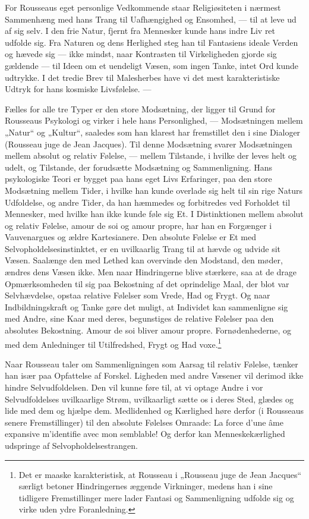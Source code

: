 \documentclass[12pt,a4paper,openany]{book}
\newcommand{\opage}[1]{\marginnote{\footnotesize\textit{[#1]}}}
\begin{document}
For Rousseaus eget personlige Vedkommende staar Religiøsiteten
i nærmest Sammenhæng med hans Trang til Uafhængighed
og Ensomhed, --- til at leve ud af sig selv. I den frie
Natur, fjernt fra Mennesker kunde hans indre Liv ret udfolde
sig. Fra Naturen og dens Herlighed steg han til Fantasiens
ideale Verden og hævede sig --- ikke mindst, naar Kontrasten
til Virkeligheden gjorde sig gældende --- til Ideen om et uendeligt
Væsen, som ingen Tanke, intet Ord kunde udtrykke. I
det tredie Brev til Malesherbes have vi det mest karakteristiske
Udtryk for hans kosmiske Livsfølelse. ---

Fælles for alle tre Typer er den store Modsætning, der
ligger til Grund for Rousseaus Psykologi og virker i hele hans
Personlighed, --- Modsætningen mellem „Natur“ og „Kultur“,
saaledes som han klarest har fremstillet den i sine Dialoger
(Rousseau juge de Jean Jacques). Til denne Modsætning svarer
Modsætningen mellem absolut og relativ Følelse, --- mellem Tilstande,
i hvilke der leves helt og udelt, og Tilstande, der
forudsætte Modsætning og Sammenligning. Hans psykologiske
Teori er bygget paa hans eget Livs Erfaringer, paa den store
Modsætning mellem Tider, i hvilke han kunde overlade sig
helt til sin rige Naturs Udfoldelse, og andre Tider, da han
\setcounter{footnote}{0}%
\opage{147}hæmmedes og forbitredes ved Forholdet til Mennesker, med
hvilke han ikke kunde føle sig Et. I Distinktionen mellem absolut
og relativ Følelse, amour de soi og amour propre, har
han en Forgænger i Vauvenargues og ældre Kartesianere. Den
absolute Følelse er Et med Selvopholdelsesinstinktet, er en uvilkaarlig
Trang til at hævde og udvide sit Væsen. Saalænge den
med Lethed kan overvinde den Modstand, den møder, ændres
dens Væsen ikke. Men naar Hindringerne blive stærkere, saa
at de drage Opmærksomheden til sig paa Bekostning af det oprindelige
Maal, der blot var Selvhævdelse, opstaa relative Følelser
som Vrede, Had og Frygt. Og naar Indbildningskraft og
Tanke gøre det muligt, at Individet kan sammenligne sig med
Andre, sine Kaar med deres, begunstiges de relative Følelser
paa den absolutes Bekostning. Amour de soi bliver amour propre.
Fornødenhederne, og med dem Anledninger til Utilfredshed, Frygt
og Had voxe.\footnote[1]{Det er maaske karakteristisk, at Rousseau i „Rousseau juge de Jean Jacques“ særligt betoner Hindringernes æggende Virkninger, medens han i sine tidligere Fremstillinger mere lader Fantasi og Sammenligning udfolde sig og virke uden ydre Foranledning.}

Naar Rousseau taler om Sammenligningen som Aarsag til
relativ Følelse, tænker han især paa Opfattelse af Forskel. Ligheden
med andre Væsener vil derimod ikke hindre Selvudfoldelsen.
Den vil kunne føre til, at vi optage Andre i vor Selvudfoldelses
uvilkaarlige Strøm, uvilkaarligt sætte os i deres Sted,
glædes og lide med dem og hjælpe dem. Medlidenhed og Kærlighed
høre derfor (i Rousseaus senere Fremstillinger) til den
absolute Følelses Omraade: La force d’une âme expansive
m’identifie avec mon semblable! Og derfor kan Menneskekærlighed
udspringe af Selvopholdelsestrangen.
\end{document}
